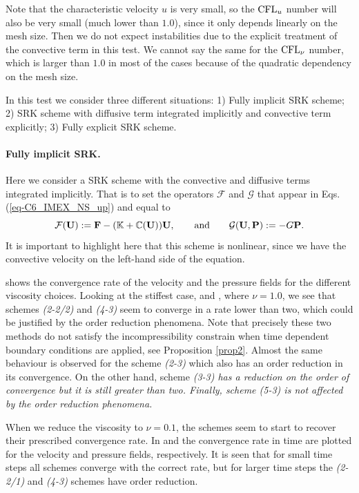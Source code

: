 Note that the characteristic velocity $u$ is very small, so the ${\rm CFL}_u$ number will also be very small (much lower than $1.0$), since it only depends linearly on the mesh size. Then we do not expect instabilities due to the explicit treatment of the convective term in this test. We cannot say the same for the ${\rm CFL}_\nu$ number, which is larger than $1.0$ in most of the cases because of the quadratic dependency on the mesh size.

In this test we consider three different situations: 1) Fully implicit SRK scheme; 2) SRK scheme with diffusive term integrated implicitly and convective term explicitly; 3) Fully explicit SRK scheme.

\paragraph{Fully implicit SRK.}

Here we consider a SRK scheme with the convective and diffusive terms integrated implicitly. That is to set the operators $\mathcal{F}$ and $\mathcal{G}$ that appear in Eqs. (\ref{eq-C6_IMEX_NS_up}) and  equal to
$$\mathcal{F}({\bf U}):={\bf F}-(\mathbb{K}+\mathbb{C}({\bf U})){\bf U},\quad\quad\mbox{and}\quad\quad\mathcal{G}({\bf U},{\bf P}):=-G{\bf P}.$$
It is important to highlight here that this scheme is nonlinear, since we have the convective velocity on the left-hand side of the equation.

 shows the convergence rate of the velocity and the pressure fields for the different viscosity choices. Looking at the stiffest case,  and , where $\nu=1.0$, we see that schemes \textit{(2-2/2)} and \textit{(4-3)} seem to converge in a rate lower than two, which could be justified by the order reduction phenomena. Note that precisely these two methods do not satisfy the incompressibility constrain when time dependent boundary conditions are applied, see Proposition \ref{prop2}. Almost the same behaviour is observed for the scheme \textit{(2-3)} which also has an order reduction in its convergence. On the other hand, scheme \textit{(3-3) has a reduction on the order of convergence but it is still greater than two. Finally, scheme \textit{(5-3)} is not affected by the order reduction phenomena.}

When we reduce the viscosity to $\nu=0.1$, the schemes seem to start to recover their prescribed convergence rate. In  and   the convergence rate in time are plotted for the velocity and pressure fields, respectively. It is seen that for small time steps all schemes converge with the correct rate, but for larger time steps the \textit{(2-2/1)} and \textit{(4-3)} schemes have order reduction.

